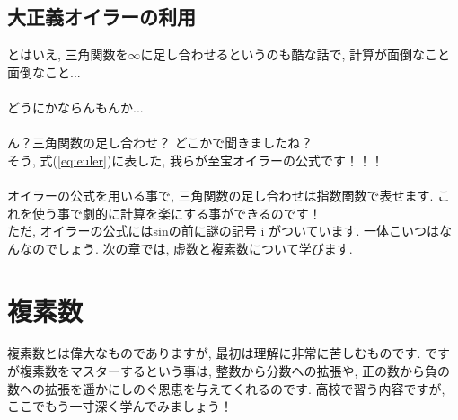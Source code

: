 \documentclass[11pt,a4paper]{jreport}
\begin{document}
\section{大正義オイラーの利用}
とはいえ, 三角関数を$\infty$に足し合わせるというのも酷な話で, 計算が面倒なこと面倒なこと...\\
\\
どうにかならんもんか...\\
\\
ん？三角関数の足し合わせ？ どこかで聞きましたね？\\
そう, 式(\ref{eq:euler})に表した, 我らが至宝オイラーの公式です！！！\\
\\
オイラーの公式を用いる事で, 三角関数の足し合わせは指数関数で表せます. これを使う事で劇的に計算を楽にする事ができるのです！\\
ただ, オイラーの公式にはsinの前に謎の記号 i がついています. 一体こいつはなんなのでしょう. 次の章では, 虚数と複素数について学びます.\\

\chapter{複素数}
複素数とは偉大なものでありますが, 最初は理解に非常に苦しむものです. ですが複素数をマスターするという事は, 整数から分数への拡張や, 正の数から負の数への拡張を遥かにしのぐ恩恵を与えてくれるのです. 高校で習う内容ですが, ここでもう一寸深く学んでみましょう！\\
\end{document}
